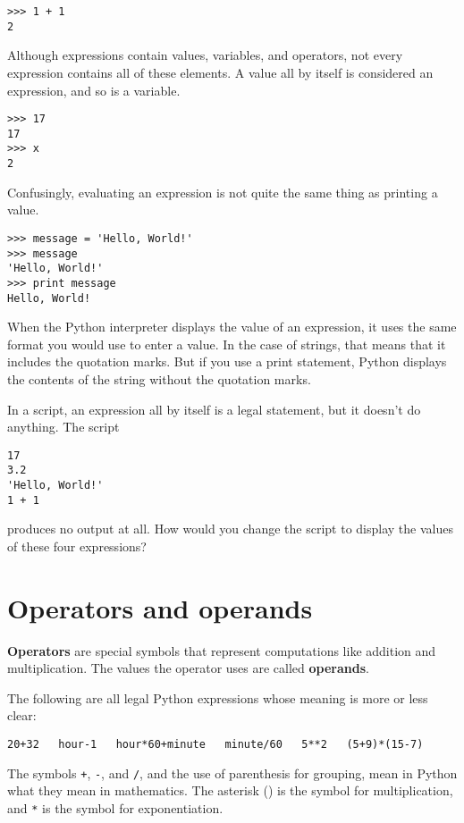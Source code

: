 \beforeverb
\begin{verbatim}
>>> 1 + 1
2
\end{verbatim}
\afterverb
%
Although expressions contain values, variables, and operators,
not every expression contains all of these elements.
A value all by itself is considered an expression, and so is
a variable.

\beforeverb
\begin{verbatim}
>>> 17
17
>>> x
2
\end{verbatim}
\afterverb
%
Confusingly, evaluating an expression is not quite the same
thing as printing a value.

\beforeverb
\begin{verbatim}
>>> message = 'Hello, World!'
>>> message
'Hello, World!'
>>> print message
Hello, World!
\end{verbatim}
\afterverb
%
When the Python interpreter displays the value of an expression, it
uses the same format you would use to enter a value.  In the case of
strings, that means that it includes the quotation marks.  But if
you use a print statement, Python displays the contents of the string
without the quotation marks.

In a script, an expression all by itself is a legal statement, but it
doesn't do anything.  The script

\beforeverb
\begin{verbatim}
17
3.2
'Hello, World!'
1 + 1
\end{verbatim}
\afterverb
%
produces no output at all.  How would you change the script to
display the values of these four expressions?


\section{Operators and operands}

{\bf Operators} are special symbols that represent computations
like addition and multiplication.  The values the operator uses are
called {\bf operands}.

The following are all legal Python expressions whose meaning is more or
less clear:
\beforeverb
\begin{verbatim}
20+32   hour-1   hour*60+minute   minute/60   5**2   (5+9)*(15-7)
\end{verbatim}
\afterverb
%
The symbols {\tt +}, {\tt -}, and {\tt /}, and the use of parenthesis for
grouping, mean in Python what they mean in mathematics.  The asterisk
({\tt *}) is the symbol for multiplication, and {\tt **} is the symbol
for exponentiation.


